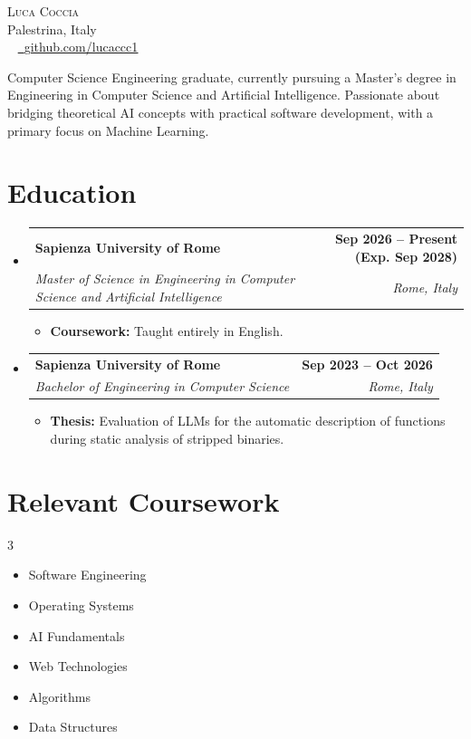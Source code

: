 \documentclass[letterpaper,11pt]{article}
\makeatletter
\newcommand{\resumeItem}[1]{
  \item\small{
    {#1 \vspace{-2pt}}
  }
}
\newcommand{\resumeSubheading}[4]{
  \vspace{-2pt}\item
    \begin{tabular*}{1.0\textwidth}[t]{l@{\extracolsep{\fill}}r}
      \textbf{#1} & \textbf{\small #2} \\
      \textit{\small#3} & \textit{\small #4} \\
    \end{tabular*}\vspace{-7pt}
}
\newcommand{\resumeSubHeadingListStart}{\begin{itemize}[leftmargin=0.0in, label={}]}
\newcommand{\resumeSubHeadingListEnd}{\end{itemize}}
\newcommand{\resumeItemListStart}{\begin{itemize}}
\newcommand{\resumeItemListEnd}{\end{itemize}\vspace{-5pt}}
\makeatother
\begin{document}
\begin{center}
    {\Huge \scshape Luca Coccia} \\ \vspace{1pt}
    Palestrina, Italy \\ \vspace{1pt}
    \small {} ~ 
    \href{https://github.com/lucaccc1}{\raisebox{-0.2\height}{\faGithub}\ \underline{github.com/lucaccc1}}
    \vspace{-8pt}
\end{center}

\vspace{5pt}
\small{Computer Science Engineering graduate, currently pursuing a Master’s degree in Engineering in Computer Science and Artificial Intelligence. Passionate about bridging theoretical AI concepts with practical software development, with a primary focus on Machine Learning.}
\vspace{5pt}

\section{Education}
  \resumeSubHeadingListStart
    \resumeSubheading
      {Sapienza University of Rome}{Sep 2026 -- Present (Exp. Sep 2028)}
      {Master of Science in Engineering in Computer Science and Artificial Intelligence}{Rome, Italy}
      \resumeItemListStart
        \resumeItem{\textbf{Coursework:} Taught entirely in English.}
      \resumeItemListEnd
    \resumeSubheading
      {Sapienza University of Rome}{Sep 2023 -- Oct 2026}
      {Bachelor of Engineering in Computer Science}{Rome, Italy}
      \resumeItemListStart
        \resumeItem{\textbf{Thesis:} Evaluation of LLMs for the automatic description of functions during static analysis of stripped binaries.}
      \resumeItemListEnd
  \resumeSubHeadingListEnd

\section{Relevant Coursework}
    \begin{multicols}{3}
        \begin{itemize}[itemsep=-5pt, parsep=3pt]
            \item\small Software Engineering
            \item Operating Systems
            \item AI Fundamentals
            \item Web Technologies
            \item Algorithms
            \item Data Structures
        \end{itemize}
    \end{multicols}
    \vspace*{2.0\multicolsep}
\end{document}
